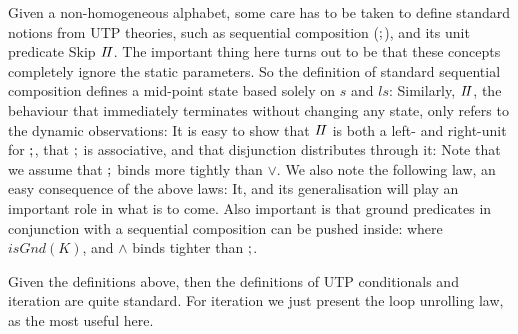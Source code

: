 Given a non-homogeneous alphabet,
some care has to be taken to define standard notions
from UTP theories, such as sequential composition ($\mathrel{;}$),
and its unit predicate Skip $I\!I$.
The important thing here turns out to be that these concepts
completely ignore the static parameters.
So the definition of standard sequential composition
defines a mid-point state based solely on $s$ and $ls$:
Similarly, $I\!I$, the behaviour that immediately terminates
without changing any state, only refers to the dynamic observations:
It is easy to show that $I\!I$ is both a left- and right-unit for $\mathrel{;}$,
that $\mathrel{;}$ is associative,
and that disjunction distributes through it:
Note that we assume that $\mathrel{;}$ binds more tightly than $\lor$.
We also note the following law, an easy consequence of the above laws:
It, and its generalisation will play an important role
in what is to come.
Also important is that ground predicates in conjunction
with a sequential composition can be pushed inside:
where $isGnd(K)$, and $\land$ binds tighter than $\mathrel{;}$.


Given the definitions above,
then the definitions of UTP conditionals and iteration
are quite standard.
For iteration we just present the loop unrolling law, as the most useful here.

